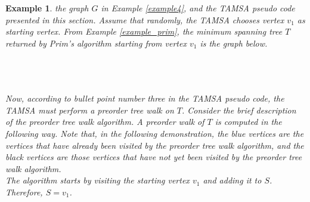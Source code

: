 \documentclass[12pt]{article}
\newtheorem{example}[definition]{Example}
\numberwithin{equation}{subsection}
\numberwithin{table}{subsection}
\numberwithin{algorithm}{subsection}
\begin{document}
\begin{example}
\label{tamsa_demonstration}
 the graph $G$ in Example \ref{example4}, and the TAMSA pseudo code presented in this section. Assume that randomly, the TAMSA chooses vertex $v_1$ as starting vertex. From Example \ref{example_prim}, the minimum spanning tree $T$ returned by Prim's algorithm starting from vertex $v_1$ is the graph below.\\\\
\\\\
Now, according to bullet point number three in the TAMSA pseudo code, the TAMSA must perform a preorder tree walk on $T$. Consider the brief description of the preorder tree walk algorithm. A preorder walk of $T$ is computed in the following way. Note that, in the following demonstration, the blue vertices are the vertices that have already been visited by the preorder tree walk algorithm, and the black vertices are those vertices that have not yet been visited by the preorder tree walk algorithm.\\
The algorithm starts by visiting the starting vertex $v_1$ and adding it to $S$. Therefore, $S = v_1$.
\\\\
\end{example}
\end{document}
